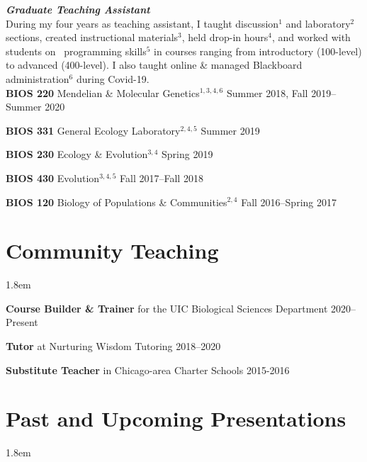 \documentclass[]{article}
\begin{document}
\textit{\textbf{Graduate Teaching Assistant}}\\
During my four years as teaching assistant, I taught discussion$^{1}$ and laboratory$^{2}$ sections, created instructional materials$^{3}$, held drop-in hours$^{4}$, and worked with students on \textcolor{light-gray}{\faRProject}\ programming skills$^{5}$ in courses ranging from introductory (100-level) to advanced (400-level). I also taught online \& managed Blackboard administration$^{6}$ during Covid-19.\\

\textbf{BIOS 220} Mendelian \& Molecular Genetics$^{1, 3, 4, 6}$ \href{https://ledelaney.org/teaching/genetics220/}{\faLink} \href{https://github.com/ledelaney/Genetics220}{\faGithub}
 \hfill Summer 2018, Fall 2019--Summer 2020


\textbf{BIOS 331} General Ecology Laboratory$^{2, 4, 5}$ \href{https://github.com/ledelaney/GeneralEcologyMaterials}{\faGithub} \hfill Summer 2019

     
\textbf{BIOS 230} Ecology \& Evolution$^{3, 4}$ \hfill Spring 2019
     
\textbf{BIOS 430} Evolution$^{3, 4, 5}$ \hfill Fall 2017--Fall 2018

\textbf{BIOS 120} Biology of Populations \& Communities$^{2, 4}$ \hfill Fall 2016--Spring 2017


\clearpage
\pagestyle{alldocument}

\section{Community Teaching}
\vspace{3mm}
\leftskip 1.8em

\textbf{Course Builder \& Trainer} for the UIC Biological Sciences Department \href{https://www.ledelaney.org/cb-materials}{\faLink} \href{https://github.com/ledelaney/cb-materials}{\faGithub} \hfill 2020--Present
     
\textbf{Tutor} at Nurturing Wisdom Tutoring \hfill 2018--2020

\textbf{Substitute Teacher} in Chicago-area Charter Schools \hfill 2015-2016

\vspace{2mm}
\section{Past and Upcoming Presentations}

\vspace{3mm}
\leftskip 1.8em
\end{document}
